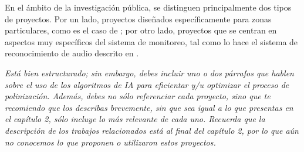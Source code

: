 En el ámbito de la investigación pública, se distinguen principalmente dos tipos de proyectos. Por un lado, proyectos diseñados específicamente para zonas particulares, como es el caso de \cite{chen_chien_hsu_jing_lin_lin_2020}; por otro lado, proyectos que se centran en aspectos muy específicos del sistema de monitoreo, tal como lo hace el sistema de reconocimiento de audio descrito en \cite{kulyukin_mukherjee_amlathe_2018}.

\textit{Está bien estructurado; sin embargo, debes incluir uno o dos párrafos que hablen sobre el uso de los algoritmos de IA para eficientar y/u optimizar el proceso de polinización. Además, debes no sólo referenciar cada proyecto, sino que te recomiendo que los describas brevemente, sin que sea igual a lo que presentas en el capítulo 2, sólo incluye lo más relevante de cada uno. Recuerda que la descripción de los trabajos relacionados está al final del capítulo 2, por lo que aún no conocemos lo que proponen o utilizaron estos proyectos.}
